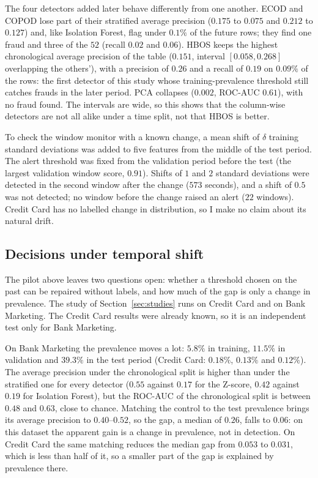\documentclass[conference]{IEEEtran}
\begin{document}
The four detectors added later behave differently from one another. ECOD and COPOD
lose part of their stratified average precision ($0.175$ to $0.075$ and $0.212$ to $0.127$)
and, like Isolation Forest, flag under $0.1\%$ of the future rows; they find one
fraud and three of the $52$ (recall $0.02$ and $0.06$). HBOS keeps the highest
chronological average precision of the table ($0.151$, interval
$[0.058, 0.268]$ overlapping the others'), with a precision of $0.26$ and a recall of $0.19$ on
$0.09\%$ of the rows: the first detector of this study whose training-prevalence threshold
still catches frauds in the later period. PCA collapses ($0.002$, ROC-AUC $0.61$), with
no fraud found. The intervals are wide, so this shows that the column-wise
detectors are not all alike under a time split, not that HBOS is better.

To check the window monitor with a known change, a mean shift of $\delta$
training standard deviations was added to five features from the middle of the
test period. The alert threshold was fixed from the validation period before
the test (the largest validation window score, $0.91$). Shifts of $1$ and $2$
standard deviations were detected in the second window after the change
($573$ seconds), and a shift of $0.5$ was not detected; no window before the
change raised an alert ($22$ windows). Credit Card has no labelled change in
distribution, so I make no claim about its natural drift.

\subsection{Decisions under temporal shift}
\label{sec:decisions}
The pilot above leaves two questions open: whether a threshold chosen on the past
can be repaired without labels, and how much of the gap is only a change in
prevalence. The study of Section~\ref{sec:studies} runs on Credit Card and on Bank
Marketing. The Credit Card results were already known, so it is an independent test only
for Bank Marketing.

On Bank Marketing the prevalence moves a lot: $5.8\%$ in training, $11.5\%$ in
validation and $39.3\%$ in the test period (Credit Card: $0.18\%$, $0.13\%$ and
$0.12\%$). The average precision under the chronological split is higher than
under the stratified one for every detector ($0.55$ against $0.17$ for the
Z-score, $0.42$ against $0.19$ for Isolation Forest), but the ROC-AUC of the
chronological split is between $0.48$ and $0.63$, close to chance. Matching the
control to the test prevalence brings its average precision to
$0.40$--$0.52$, so the gap, a median of $0.26$, falls to $0.06$: on this
dataset the apparent gain is a change in prevalence, not in detection. On Credit
Card the same matching reduces the median gap from $0.053$ to $0.031$, which is
less than half of it, so a smaller part of the gap is explained by prevalence
there.
\end{document}
